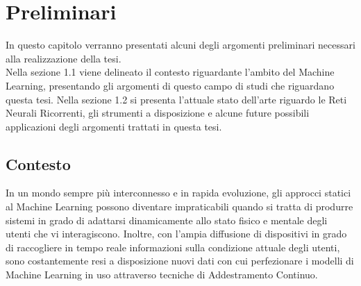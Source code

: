\chapter{Preliminari}
In questo capitolo verranno presentati alcuni degli argomenti preliminari necessari alla realizzazione della tesi.\\
Nella sezione 1.1 viene delineato il contesto riguardante l'ambito del Machine Learning, presentando gli argomenti di questo campo di studi che riguardano questa tesi. Nella sezione 1.2 si presenta l'attuale stato dell'arte riguardo le Reti Neurali Ricorrenti, gli strumenti a disposizione e alcune future possibili applicazioni degli argomenti trattati in questa tesi.

\section{Contesto}
In un mondo sempre più interconnesso e in rapida evoluzione, gli approcci statici al Machine Learning possono diventare impraticabili quando si tratta di produrre sistemi in grado di adattarsi dinamicamente allo stato fisico e mentale degli utenti che vi interagiscono. Inoltre, con l'ampia diffusione di dispositivi in grado di raccogliere in tempo reale informazioni sulla condizione attuale degli utenti, sono costantemente resi a disposizione nuovi dati con cui perfezionare i modelli di Machine Learning in uso attraverso tecniche di Addestramento Continuo.

